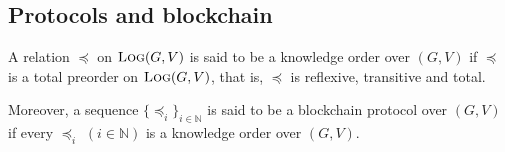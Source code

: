 

\subsection{Protocols and blockchain}

\begin{mydef}
	A relation $\preceq$ on $\text{\sc Log}(G,V)$ is said to be a knowledge order over $(G,V)$ if $\preceq$ is a total preorder on $\text{\sc Log}(G,V)$, that is, $\preceq$ is reflexive, transitive and total.
	
	Moreover, a sequence $\{ \preceq_i\}_{i \in \mathbb{N}}$ is said to be a blockchain protocol over $(G,V)$ if every $\preceq_i$ $(i \in \mathbb{N})$ is a knowledge order over $(G,V)$.
\end{mydef}



%


